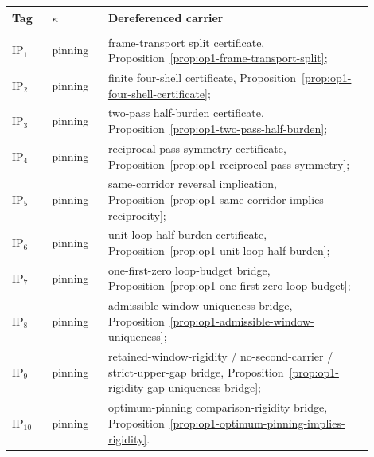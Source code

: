 {\begin{center}
\begin{tabular}{@{}>{\raggedright\arraybackslash}p{0.10\linewidth}>{\raggedright\arraybackslash}p{0.14\linewidth}>{\raggedright\arraybackslash}p{0.66\linewidth}@{}}
\toprule
Tag & $\kappa$ & Dereferenced carrier \\
\midrule
\multicolumn{3}{@{}l@{}}{\textbf{Optimum-pinning submenu} $M^{\mathrm{pin}}_{\mathrm{imb}}$}\\[0.2em]
$\mathrm{IP}_1$ & pinning & frame-transport split certificate, Proposition~\ref{prop:op1-frame-transport-split};\\
$\mathrm{IP}_2$ & pinning & finite four-shell certificate, Proposition~\ref{prop:op1-four-shell-certificate};\\
$\mathrm{IP}_3$ & pinning & two-pass half-burden certificate, Proposition~\ref{prop:op1-two-pass-half-burden};\\
$\mathrm{IP}_4$ & pinning & reciprocal pass-symmetry certificate, Proposition~\ref{prop:op1-reciprocal-pass-symmetry};\\
$\mathrm{IP}_5$ & pinning & same-corridor reversal implication, Proposition~\ref{prop:op1-same-corridor-implies-reciprocity};\\
$\mathrm{IP}_6$ & pinning & unit-loop half-burden certificate, Proposition~\ref{prop:op1-unit-loop-half-burden};\\
$\mathrm{IP}_7$ & pinning & one-first-zero loop-budget bridge, Proposition~\ref{prop:op1-one-first-zero-loop-budget};\\
$\mathrm{IP}_8$ & pinning & admissible-window uniqueness bridge, Proposition~\ref{prop:op1-admissible-window-uniqueness};\\
$\mathrm{IP}_9$ & pinning & retained-window-rigidity / no-second-carrier / strict-upper-gap bridge, Proposition~\ref{prop:op1-rigidity-gap-uniqueness-bridge};\\
$\mathrm{IP}_{10}$ & pinning & optimum-pinning comparison-rigidity bridge, Proposition~\ref{prop:op1-optimum-pinning-implies-rigidity}.\\
\bottomrule
\end{tabular}
\end{center}

}
